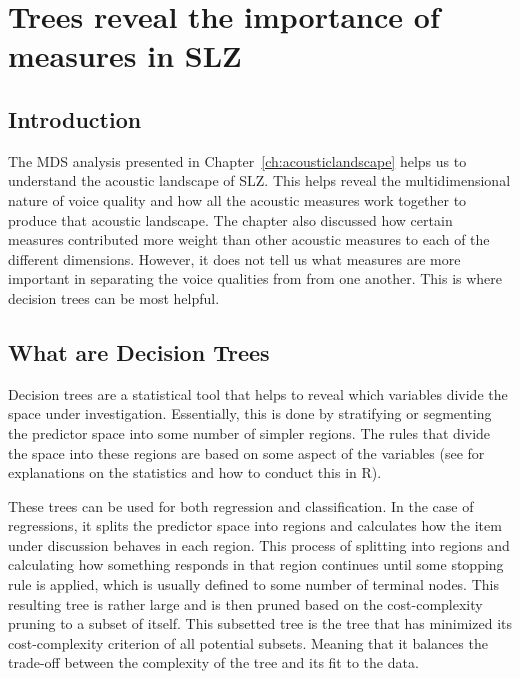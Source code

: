 \chapter{Trees reveal the importance of measures in SLZ} \label{ch:bagging}

\section{Introduction} \label{sec:bagging_intro}

The MDS analysis presented in Chapter~\ref{ch:acousticlandscape} helps us to understand the acoustic landscape of SLZ. This helps reveal the multidimensional nature of voice quality and how all the acoustic measures work together to produce that acoustic landscape. The chapter also discussed how certain measures contributed more weight than other acoustic measures to each of the different dimensions. However, it does not tell us what measures are more important in separating the voice qualities from from one another. This is where decision trees can be most helpful.

\section{What are Decision Trees} \label{sec:bagging_what}

Decision trees are a statistical tool that helps to reveal which variables divide the space under investigation. Essentially, this is done by stratifying or segmenting the predictor space into some number of simpler regions. The rules that divide the space into these regions are based on some aspect of the variables (see \cite{hastieElementsStatisticalLearning2009,jamesIntroductionStatisticalLearning2021} for explanations on the statistics and how to conduct this in R). 

These trees can be used for both regression and classification. In the case of regressions, it splits the predictor space into regions and calculates how the item under discussion behaves in each region. This process of splitting into regions and calculating how something responds in that region continues until some stopping rule is applied, which is usually defined to some number of terminal nodes. This resulting tree is rather large and is then pruned based on the cost-complexity pruning to a subset of itself. This subsetted tree is the tree that has minimized its cost-complexity criterion of all potential subsets. Meaning that it balances the trade-off between the complexity of the tree and its fit to the data. 

